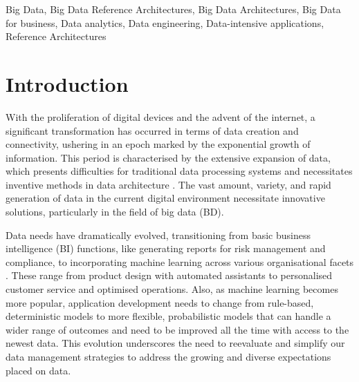 \documentclass[journal]{IEEEtran}
\begin{document}
\begin{IEEEkeywords}
  Big Data, Big Data Reference Architectures, Big Data Architectures, Big Data for business, Data analytics, Data engineering, Data-intensive applications, Reference Architectures
\end{IEEEkeywords}






%
\IEEEpeerreviewmaketitle




\section{Introduction}
\label{sec:introduction} 

With the proliferation of digital devices and the advent of the internet, a significant transformation has occurred in terms of data creation and connectivity, ushering in an epoch marked by the exponential growth of information. This period is characterised by the extensive expansion of data, which presents difficulties for traditional data processing systems and necessitates inventive methods in data architecture \cite{AtaeiACIS,DataMesh}. The vast amount, variety, and rapid generation of data in the current digital environment necessitate innovative solutions, particularly in the field of big data (BD).

Data needs have dramatically evolved, transitioning from basic business intelligence (BI) functions, like generating reports for risk management and compliance, to incorporating machine learning across various organisational facets \cite{ataei2023towards}. These range from product design with automated assistants to personalised customer service and optimised operations.  Also, as machine learning becomes more popular, application development needs to change from rule-based, deterministic models to more flexible, probabilistic models that can handle a wider range of outcomes and need to be improved all the time with access to the newest data. This evolution underscores the need to reevaluate and simplify our data management strategies to address the growing and diverse expectations placed on data.
\end{document}
